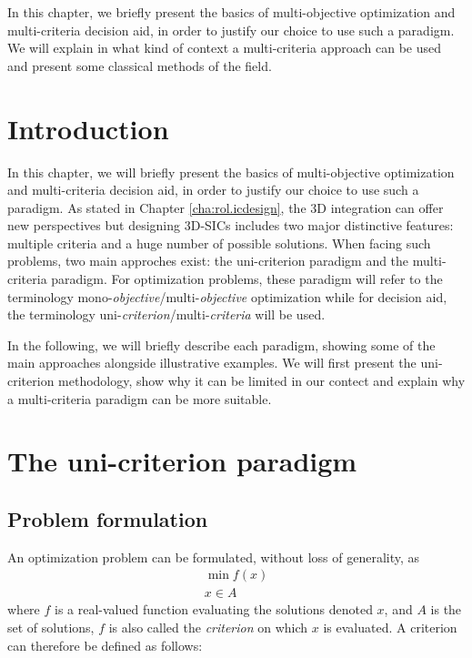 \label{cha:rol.mcda}

\begin{summary}
In this chapter, we briefly present the basics of multi-objective optimization and multi-criteria decision aid, in order to justify our choice to use such a paradigm. We will explain in what kind of context a multi-criteria approach can be used and present some classical methods of the field.
\end{summary}

\section{Introduction}
\label{sec:rol2.intro}
In this chapter, we will briefly present the basics of multi-objective optimization and multi-criteria decision aid, in order to justify our choice to use such a paradigm. As stated in Chapter \ref{cha:rol.icdesign}, the 3D integration can offer new perspectives but designing 3D-SICs includes two major distinctive features: multiple criteria and a huge number of possible solutions. When facing such problems, two main approches exist: the uni-criterion paradigm and the multi-criteria paradigm. For optimization problems, these paradigm will refer to the terminology mono-\emph{objective}/multi-\emph{objective} optimization while for decision aid, the terminology uni-\emph{criterion}/multi-\emph{criteria} will be used.

In the following, we will briefly describe each paradigm, showing some of the main approaches alongside illustrative examples. We will first present the uni-criterion methodology, show why it can be limited in our contect and explain why a multi-criteria paradigm can be more suitable.

\section{The uni-criterion paradigm}
\label{sec:rol2.unicrit_paradigm}

\subsection{Problem formulation}
An optimization problem can be formulated, without loss of generality, as \cite{BraMar2002}
\begin{equation}
\label{eqn:optiprob}
\begin{gathered}
\min f(x)\\
x \in A
\end{gathered}
\end{equation}
where $f$ is a real-valued function evaluating the solutions denoted $x$, and $A$ is the set of solutions, $f$ is also called the \emph{criterion} on which $x$ is evaluated. A criterion can therefore be defined as follows:

